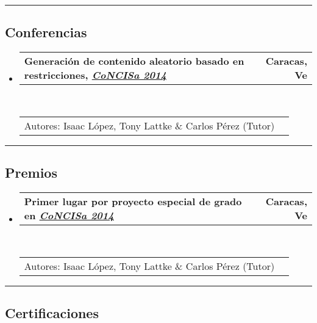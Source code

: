 \documentclass[10pt,letterpaper]{article}
\makeatletter
\newcommand{\headerrow}[2]
{\begin{tabular*}{\linewidth}{l@{\extracolsep{\fill}}r}
	#1 &
	#2 \\
\end{tabular*}}
\makeatother
\begin{document}
\hrule
\vspace{-0.4em}
\subsection*{Conferencias}

\begin{itemize}
  \parskip=0.1em
\item 
   \headerrow
   {\textbf{Generación de contenido aleatorio basado en restricciones, \emph{\href{http://www.concisa.net.ve/2014/}{CoNCISa 2014}}}}
   {\textbf{Caracas, Ve}}
  \\
  \headerrow
   {Autores: Isaac López, Tony Lattke \& Carlos Pérez (Tutor)}{}
\end{itemize}
\newpage
\hrule
\vspace{-0.4em}
\subsection*{Premios}

\begin{itemize}
  \parskip=0.1em
\item 
   \headerrow
   {\textbf{Primer lugar por proyecto especial de grado en \emph{\href{http://www.concisa.net.ve/2014/}{CoNCISa 2014}}}}
   {\textbf{Caracas, Ve}}
  \\
  \headerrow
   {Autores: Isaac López, Tony Lattke \& Carlos Pérez (Tutor)}{}
\end{itemize}

\hrule
\vspace{-0.4em}
\subsection*{Certificaciones}
\end{document}
